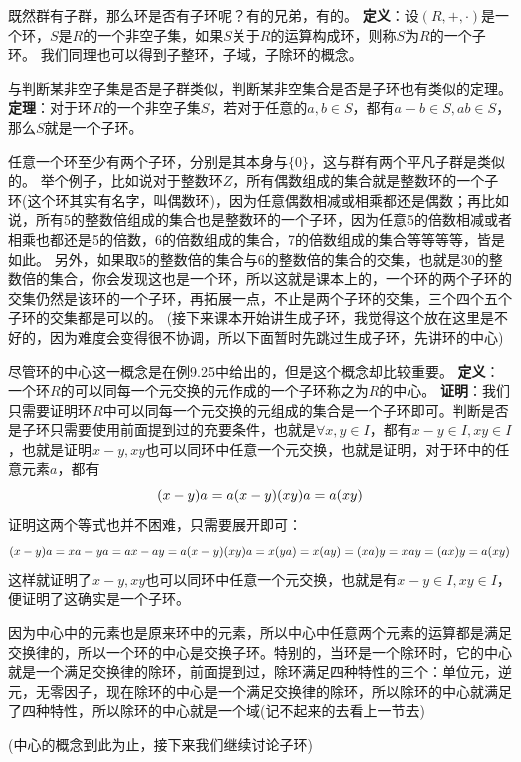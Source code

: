 \documentclass[12pt, a4paper, oneside]{ctexart}
\begin{document}
既然群有子群，那么环是否有子环呢？有的兄弟，有的。
\textbf{定义}：设$(R,+,\cdot)$是一个环，$S$是$R$的一个非空子集，如果$S$关于$R$的运算构成环，则称$S$为$R$的一个子环。
我们同理也可以得到子整环，子域，子除环的概念。

与判断某非空子集是否是子群类似，判断某非空集合是否是子环也有类似的定理。
\textbf{定理}：对于环$R$的一个非空子集$S$，若对于任意的$a,b\in S$，都有$a-b\in S,ab\in S$，那么$S$就是一个子环。

任意一个环至少有两个子环，分别是其本身与$\{0\}$，这与群有两个平凡子群是类似的。
举个例子，比如说对于整数环$Z$，所有偶数组成的集合就是整数环的一个子环(这个环其实有名字，叫偶数环)，因为任意偶数相减或相乘都还是偶数；再比如说，所有5的整数倍组成的集合也是整数环的一个子环，因为任意5的倍数相减或者相乘也都还是5的倍数，6的倍数组成的集合，7的倍数组成的集合等等等等，皆是如此。
另外，如果取5的整数倍的集合与6的整数倍的集合的交集，也就是30的整数倍的集合，你会发现这也是一个环，所以这就是课本上的，一个环的两个子环的交集仍然是该环的一个子环，再拓展一点，不止是两个子环的交集，三个四个五个子环的交集都是可以的。
(接下来课本开始讲生成子环，我觉得这个放在这里是不好的，因为难度会变得很不协调，所以下面暂时先跳过生成子环，先讲环的中心)

尽管环的中心这一概念是在例9.25中给出的，但是这个概念却比较重要。
\textbf{定义}：一个环$R$的可以同每一个元交换的元作成的一个子环称之为$R$的中心。
\textbf{证明}：我们只需要证明环$R$中可以同每一个元交换的元组成的集合是一个子环即可。判断是否是子环只需要使用前面提到过的充要条件，也就是$\forall x,y\in I$，都有$x-y\in I,xy\in I$，也就是证明$x-y,xy$也可以同环中任意一个元交换，也就是证明，对于环中的任意元素$a$，都有
\[
(x-y)a=a(x-y)\\
(xy)a=a(xy)
\]
证明这两个等式也并不困难，只需要展开即可：
\[
(x-y)a=xa-ya=ax-ay=a(x-y)\\
(xy)a=x(ya)=x(ay)=(xa)y=xay=(ax)y=a(xy)
\]
这样就证明了$x-y,xy$也可以同环中任意一个元交换，也就是有$x-y\in I,xy\in I$，便证明了这确实是一个子环。

因为中心中的元素也是原来环中的元素，所以中心中任意两个元素的运算都是满足交换律的，所以一个环的中心是交换子环。特别的，当环是一个除环时，它的中心就是一个满足交换律的除环，前面提到过，除环满足四种特性的三个：单位元，逆元，无零因子，现在除环的中心是一个满足交换律的除环，所以除环的中心就满足了四种特性，所以除环的中心就是一个域(记不起来的去看上一节去)

(中心的概念到此为止，接下来我们继续讨论子环)
\end{document}

